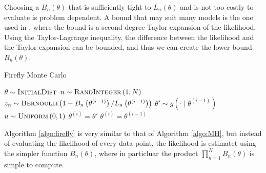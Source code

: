 Choosing a $B_n\left(\theta\right)$ that is sufficiently tight to $L_n\left(\theta\right)$ and is not too costly to evaluate is problem dependent. A bound that may suit many models is the one used in \cite{Bardenet:1}, where the bound is a second degree Taylor  expansion of the likelihood. Using the Taylor-Lagrange inequality, the difference between the likelihood and the Taylor expansion can be bounded, and thus we can create the lower bound $B_n\left(\theta\right)$.  
\begin{algorithm}[H]
    \caption{Firefly Monte Carlo}
    \label{algo:firefly}
    \begin{algorithmic}[1] %
        \State $\theta \sim \textsc{InitialDist}$ 
        \State $n\sim \textsc{RandInteger}\left(1, N\right)$
        \State $z_n \sim \textsc{Bernoulli}\left(1 - B_n\left(\theta^{\left(i - 1\right)}\right)/L_n\left(\theta^{\left(i-1\right)}\right)\right) $ \label{algo:firefly:z}
        \EndFor
        \State$\theta' \sim g\left(\cdot\mid\theta^{(i-1)}\right)$
        \State $u\sim \textsc{Uniform}\left(0,1\right)$
         \label{algo:firefly:accept_reject}
        \State $\theta^{\left(i\right)} = \theta '$
        \Else 
        \State $\theta^{\left(i\right)} = \theta^{\left(i-1\right)}$
         \EndIf
         \EndFor
         \\
        \State{\Return }
        \EndFunction
    \end{algorithmic}
\end{algorithm}
Algorithm \ref{algo:firefly} is very similar to that of Algorithm \ref{algo:MH}, but instead of evaluating the likelihood of every data point, the likelihood is estimatet using the simpler function $B_n\left(\theta\right)$, where in particluar the product $\prod_{n=1}^N B_n\left(\theta\right)$ is simple to compute. 
